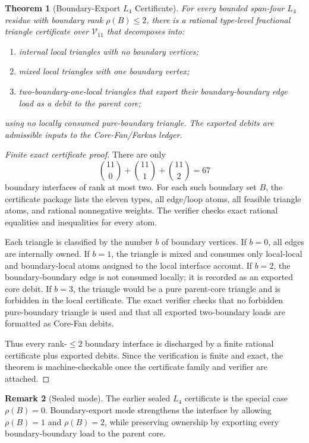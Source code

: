 \documentclass[11pt]{article}
\newtheorem{theorem}{Theorem}[section]
\theoremstyle{definition}
\newtheorem{remark}[theorem]{Remark}
\newcommand{\calV}{\mathcal V}
\begin{document}
\begin{theorem}[Boundary-Export \(L_4\) Certificate]
\label{thm:l4-certificate}
For every bounded span-four \(L_4\) residue with boundary rank \(\rho(B)\le2\), there is a rational type-level fractional triangle certificate over \(\calV_{11}\) that decomposes into:
\begin{enumerate}[label=(\roman*)]
    \item internal local triangles with no boundary vertices;
    \item mixed local triangles with one boundary vertex;
    \item two-boundary-one-local triangles that export their boundary-boundary edge load as a debit to the parent core;
\end{enumerate}
using no locally consumed pure-boundary triangle. The exported debits are admissible inputs to the Core-Fan/Farkas ledger.
\end{theorem}

\begin{proof}[Finite exact certificate proof]
There are only
\[
    \binom{11}{0}+\binom{11}{1}+\binom{11}{2}=67
\]
boundary interfaces of rank at most two. For each such boundary set \(B\), the certificate package lists the eleven types, all edge/loop atoms, all feasible triangle atoms, and rational nonnegative weights. The verifier checks exact rational equalities and inequalities for every atom.

Each triangle is classified by the number \(b\) of boundary vertices. If \(b=0\), all edges are internally owned. If \(b=1\), the triangle is mixed and consumes only local-local and boundary-local atoms assigned to the local interface account. If \(b=2\), the boundary-boundary edge is not consumed locally; it is recorded as an exported core debit. If \(b=3\), the triangle would be a pure parent-core triangle and is forbidden in the local certificate. The exact verifier checks that no forbidden pure-boundary triangle is used and that all exported two-boundary loads are formatted as Core-Fan debits.

Thus every rank-\(\le2\) boundary interface is discharged by a finite rational certificate plus exported debits. Since the verification is finite and exact, the theorem is machine-checkable once the certificate family and verifier are attached.
\end{proof}

\begin{remark}[Sealed mode]
The earlier sealed \(L_4\) certificate is the special case \(\rho(B)=0\). Boundary-export mode strengthens the interface by allowing \(\rho(B)=1\) and \(\rho(B)=2\), while preserving ownership by exporting every boundary-boundary load to the parent core.
\end{remark}
\end{document}

